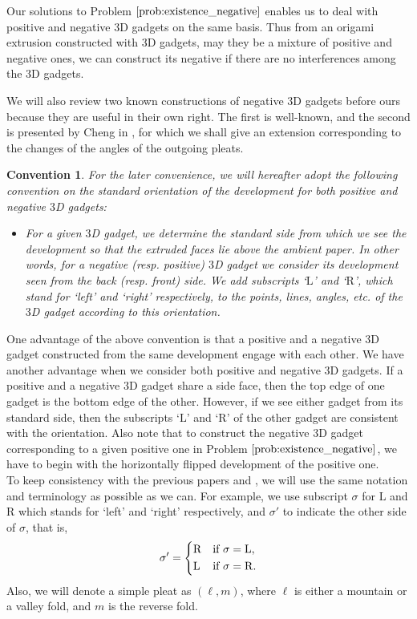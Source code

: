 \documentclass[11pt]{amsart}
\newtheorem{convention}[theorem]{Convention}
\numberwithin{equation}{section}
\numberwithin{theorem}{section}
\newcommand{\Lt}{\ensuremath{\mathrm{L}}}
\newcommand{\Rt}{\ensuremath{\mathrm{R}}}
\begin{document}
Our solutions to Problem $\ref{prob:existence_negative}$ enables us to deal with positive and negative $3$D gadgets on the same basis.
Thus from an origami extrusion constructed with $3$D gadgets, may they be a mixture of positive and negative ones,
we can construct its negative if there are no interferences among the $3$D gadgets.

We will also review two known constructions of negative $3$D gadgets before ours because they are useful in their own right.
The first is well-known, and the second is presented by Cheng in \cite{Cheng},
for which we shall give an extension corresponding to the changes of the angles of the outgoing pleats.

\begin{convention}\rm
For the later convenience, we will hereafter adopt the following convention on the standard orientation of the development
for both positive and negative $3$D gadgets:
\begin{itemize}
\item[] For a given $3$D gadget, we determine the standard side from which we see the development so that the extruded faces lie \emph{above} the ambient paper.
In other words, for a negative (resp. positive) $3$D gadget we consider its development seen from the \emph{back} (resp. front) side.
We add subscripts `$\Lt$' and `$\Rt$', which stand for `left' and `right' respectively,
to the points, lines, angles, etc. of the $3$D gadget according to this orientation.
\end{itemize}
\end{convention}
One advantage of the above convention is that a positive and a negative $3$D gadget constructed from the same development engage with each other.
We have another advantage when we consider both positive and negative $3$D gadgets.
If a positive and a negative $3$D gadget share a side face, then the top edge of one gadget is the bottom edge of the other.
However, if we see either gadget from its standard side, then the subscripts `$\Lt$' and `$\Rt$' of the other gadget are consistent with the orientation.
Also note that to construct the negative $3$D gadget corresponding to a given positive one in Problem $\ref{prob:existence_negative}$,
we have to begin with the horizontally flipped development of the positive one.\\

To keep consistency with the previous papers \cite{Doi19} and \cite{Doi20}, we will use the same notation and terminology as possible as we can.
For example, we use subscript $\sigma$ for $\Lt$ and $\Rt$ which stands for `left' and `right' respectively,
and $\sigma'$ to indicate the other side of $\sigma$, that is,
\begin{equation*}
\sigma' =
\begin{dcases}
\Rt&\text{if }\sigma =\Lt ,\\
\Lt&\text{if }\sigma =\Rt .
\end{dcases}
\end{equation*}
Also, we will denote a simple pleat as $(\ell ,m)$, where $\ell$ is either a mountain or a valley fold, and $m$ is the reverse fold.\\
\end{document}
